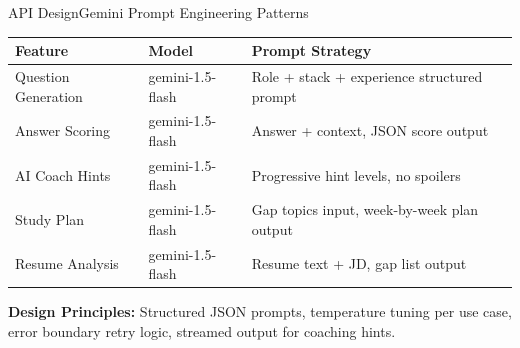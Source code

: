 \documentclass{beamer}
\begin{document}
\begin{frame}{API Design}{Gemini Prompt Engineering Patterns}
\scriptsize
\begin{table}
\centering
\begin{tabular}{|l|l|p{4.5cm}|}
\hline
\textbf{Feature} & \textbf{Model} & \textbf{Prompt Strategy} \\ \hline
Question Generation & gemini-1.5-flash & Role + stack + experience structured prompt \\ \hline
Answer Scoring & gemini-1.5-flash & Answer + context, JSON score output \\ \hline
AI Coach Hints & gemini-1.5-flash & Progressive hint levels, no spoilers \\ \hline
Study Plan & gemini-1.5-flash & Gap topics input, week-by-week plan output \\ \hline
Resume Analysis & gemini-1.5-flash & Resume text + JD, gap list output \\ \hline
\end{tabular}
\end{table}

\vspace{4pt}
\textbf{Design Principles:} Structured JSON prompts, temperature tuning per use case, error boundary retry logic, streamed output for coaching hints.
\end{frame}

\end{document}
